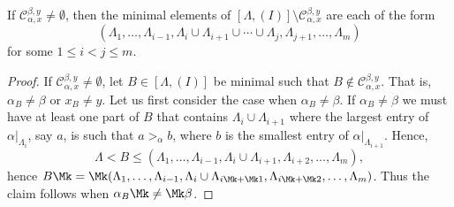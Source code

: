 \begin{lemma}\label{le:upperideal} If $ \mathcal{C}_{\alpha,x}^{\beta,y}\ne \emptyset$,
then the minimal elements of $[\Lambda,(I)]\setminus \mathcal{C}_{\alpha,x}^{\beta,y}$ are each of the form
 $$(\Lambda_1,\ldots,\Lambda_{i-1},\Lambda_i\cup\Lambda_{i+1}\cup\cdots\cup \Lambda_j,\Lambda_{j+1},\ldots,\Lambda_m)$$
for some $1\le i<j\le m$.
\end{lemma}
\begin{proof}
If $ \mathcal{C}_{\alpha,x}^{\beta,y}\ne\emptyset$, let $B\in [\Lambda,(I)]$ be minimal such that $B\notin \mathcal{C}_{\alpha,x}^{\beta,y}$.
That is, $\alpha_B\ne \beta$ or $x_B\ne y$. Let us first consider the case when $\alpha_B\ne \beta$. 
If $\alpha_B\ne \beta$ we must have at least one part of $B$ that contains $\Lambda_i\cup\Lambda_{i+1}$ where the largest entry of $\alpha|_{\Lambda_i}$, say $a$, is such that $a>_{\alpha}b$, where $b$ is the smallest entry of $\alpha|_{\Lambda_{i+1}}$. Hence, 
 $$\Lambda<B\le (\Lambda_1,\ldots,\Lambda_{i-1},\Lambda_i\cup\Lambda_{i+1},\Lambda_{i+2},\ldots,\Lambda_m),$$
hence $B\Mk = \Mk (\Lambda_1,\ldots,\Lambda_{i-1},\Lambda_i\cup\Lambda_{i\Mk +\Mk 1},\Lambda_{i\Mk +\Mk 2},\ldots,\Lambda_m)$. Thus the claim follows when $\alpha_B\Mk \neq\Mk \beta$. 



\end{proof}
